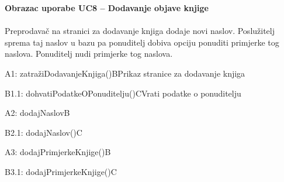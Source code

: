 				\textbf{Obrazac uporabe UC8 – Dodavanje objave knjige}\\\\
				Preprodavač na stranici za dodavanje knjiga dodaje novi naslov. Poslužitelj sprema taj naslov u bazu pa ponuditelj dobiva opciju ponuditi primjerke tog naslova. Ponuditelj nudi primjerke tog naslova.\\
				\begin{center}
					\begin{adjustbox}{max width=\textwidth}
						\begin{sequencediagram}
							\begin{call}{A}{1: zatražiDodavanjeKnjiga()}{B}{Prikaz stranice za dodavanje knjiga}
								\begin{call}{B}{1.1: dohvatiPodatkeOPonuditelju()}{C}{Vrati podatke o ponuditelju}
								\end{call}
							\end{call}
							\postlevel
							\begin{messcall}{A}{2: dodajNaslov}{B}
								\begin{messcall}{B}{2.1: dodajNaslov()}{C}
								\end{messcall}
							\end{messcall}
							\begin{messcall}{A}{3: dodajPrimjerkeKnjige()}{B}
								\begin{messcall}{B}{3.1: dodajPrimjerkeKnjige()}{C}
								\end{messcall}
							\end{messcall}
						\end{sequencediagram}
					\end{adjustbox}
				\end{center}
				\eject
				

